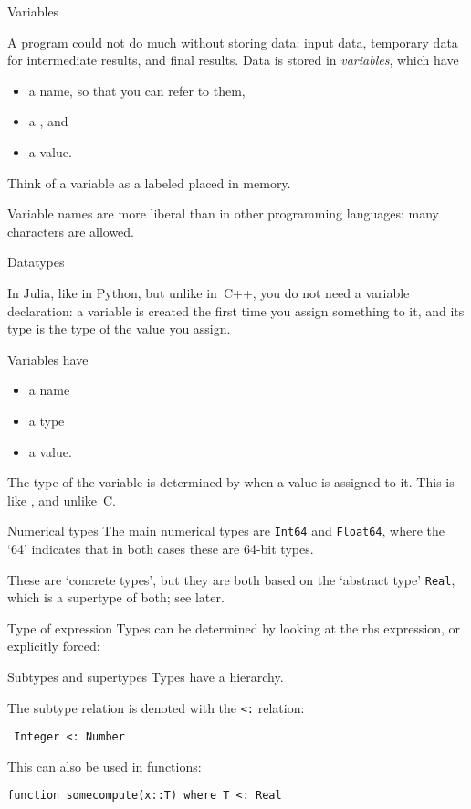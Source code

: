  {Variables}
\label{sec:variablesj}

A program could not do much without storing data: input data,
temporary data for intermediate results, and final results.
Data is stored in \emph{variables},  which have
\begin{itemize}
\item a name, so that you can refer to them,
\item a , and
\item a value.
\end{itemize}
Think of a variable as a labeled placed in memory.

Variable names are more liberal than in other programming languages:
many  characters are allowed.

 {Datatypes}
\label{sec:jtypes}

In Julia, like in Python, but unlike in~C++,
you do not need a variable declaration:
a variable is created the first time you assign something to it,
and its type is the type of the value you assign.

Variables have
\begin{itemize}
\item a name
\item a type
\item a value.
\end{itemize}
The type of the variable is determined by when a value is assigned to it.
This is like \jvp, and unlike~C.

\begin{block}{Numerical types}
  The main numerical types are \lstinline{Int64} and \lstinline{Float64},
  where the `64' indicates that in both cases these are 64-bit types.

  These are `concrete types', but they are both based on the `abstract
  type' \lstinline{Real}, which is a supertype of both; see later.
\end{block}

\begin{block}{Type of expression}
  Types can be determined by looking at the rhs expression,
  or explicitly forced:
\end{block}

\begin{block}{Subtypes and supertypes}
  Types have a hierarchy.
  
  The subtype relation is denoted with the \verb+<:+ relation:
\begin{lstlisting}
 Integer <: Number  
\end{lstlisting}
This can also be used in functions:
\begin{lstlisting}
function somecompute(x::T) where T <: Real
\end{lstlisting}
\end{block}

